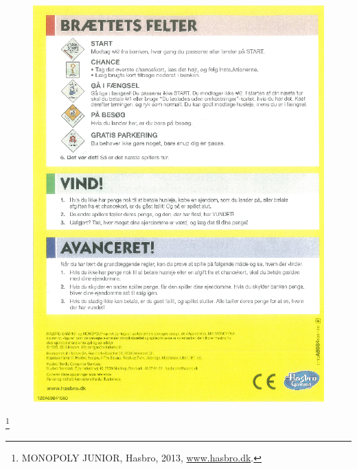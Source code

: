 \begin{figure}[H]
    \begin{center}
        \includegraphics[width=13cm]{graphics/rules/Rules3.png}
    \end{center}
\end{figure}
\footnote{MONOPOLY JUNIOR, Hasbro, 2013, \href{https://www.hasbro.dk}{www.hasbro.dk}.}
\pagebreak
